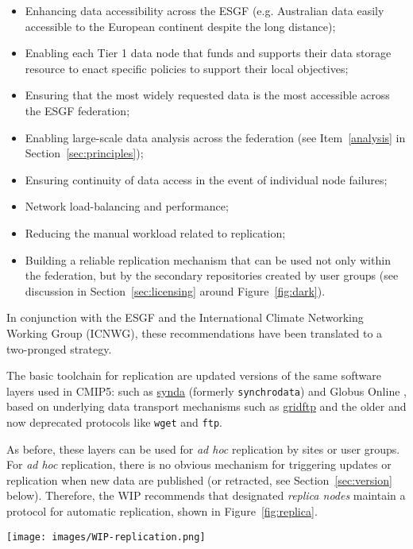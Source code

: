 \documentclass[gmd,manuscript]{copernicus}
\newcommand{\pipref}[1] {\citep{ref:#1}}
\newcommand{\figref}[1] {\mbox{Figure   \ref{fig:#1}}}
\newcommand{\secref}[1] {\mbox{Section  \ref{sec:#1}}}
\begin{document}
\begin{itemize}
\item Enhancing data accessibility across the ESGF (e.g. Australian
  data easily accessible to the European continent despite the long
  distance);
\item Enabling each Tier 1 data node that funds and supports their
  data storage resource to enact specific policies to support their
  local objectives;
\item Ensuring that the most widely requested data is the most
  accessible across the ESGF federation;
\item Enabling large-scale data analysis across the federation (see
  Item~\ref{analysis} in \secref{principles});
\item Ensuring continuity of data access in the event of individual node
  failures;
\item Network load-balancing and performance;
\item Reducing the manual workload related to replication;
\item Building a reliable replication mechanism that can be used not
  only within the federation, but by the secondary repositories
  created by user groups (see discussion in \secref{licensing} around
  \figref{dark}).
\end{itemize}

In conjunction with the ESGF and the International Climate Networking
Working Group (ICNWG), these recommendations have been translated to a
two-pronged strategy.

The basic toolchain for replication are updated versions of the same
software layers used in CMIP5: such as
\href{https://github.com/Prodiguer/synda}{synda} (formerly
\texttt{synchrodata}) and Globus Online \pipref{allenetal2012}, based
on underlying data transport mechanisms such as
\href{https://goo.gl/Z8xcfE}{gridftp} and the older and now deprecated
protocols like \texttt{wget} and \texttt{ftp}.

As before, these layers can be used for \emph{ad hoc} replication by
sites or user groups. For \emph{ad hoc} replication, there is no
obvious mechanism for triggering updates or replication when new data
are published (or retracted, see \secref{version} below). Therefore,
the WIP recommends that designated \emph{replica nodes} maintain a
protocol for automatic replication, shown in \figref{replica}.

\begin{figure*}
  \begin{center}
    \texttt{[image: images/WIP-replication.png]}
  \end{center}
  \caption{CMIP6 replication from data nodes to replica centers and
    between replica centers coordinated by a CMIP6 replication team.}
  \label{fig:replica}
\end{figure*}
\end{document}
